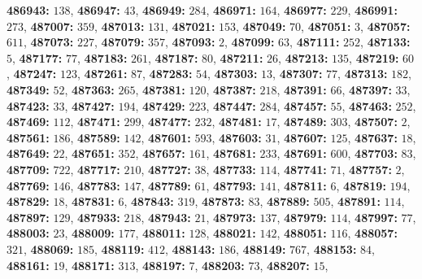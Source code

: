 \textsf{\bfseries 486943:} $138$, \textsf{\bfseries 486947:} $43$, \textsf{\bfseries 486949:} $284$, \textsf{\bfseries 486971:} $164$, \textsf{\bfseries 486977:} $229$, \textsf{\bfseries 486991:} $273$, \textsf{\bfseries 487007:} $359$, \textsf{\bfseries 487013:} $131$, \textsf{\bfseries 487021:} $153$, \textsf{\bfseries 487049:} $70$, \textsf{\bfseries 487051:} $3$, \textsf{\bfseries 487057:} $611$, \textsf{\bfseries 487073:} $227$, \textsf{\bfseries 487079:} $357$, \textsf{\bfseries 487093:} $2$, \textsf{\bfseries 487099:} $63$, \textsf{\bfseries 487111:} $252$, \textsf{\bfseries 487133:} $5$, \textsf{\bfseries 487177:} $77$, \textsf{\bfseries 487183:} $261$, \textsf{\bfseries 487187:} $80$, \textsf{\bfseries 487211:} $26$, \textsf{\bfseries 487213:} $135$, \textsf{\bfseries 487219:} $60$, \textsf{\bfseries 487247:} $123$, \textsf{\bfseries 487261:} $87$, \textsf{\bfseries 487283:} $54$, \textsf{\bfseries 487303:} $13$, \textsf{\bfseries 487307:} $77$, \textsf{\bfseries 487313:} $182$, \textsf{\bfseries 487349:} $52$, \textsf{\bfseries 487363:} $265$, \textsf{\bfseries 487381:} $120$, \textsf{\bfseries 487387:} $218$, \textsf{\bfseries 487391:} $66$, \textsf{\bfseries 487397:} $33$, \textsf{\bfseries 487423:} $33$, \textsf{\bfseries 487427:} $194$, \textsf{\bfseries 487429:} $223$, \textsf{\bfseries 487447:} $284$, \textsf{\bfseries 487457:} $55$, \textsf{\bfseries 487463:} $252$, \textsf{\bfseries 487469:} $112$, \textsf{\bfseries 487471:} $299$, \textsf{\bfseries 487477:} $232$, \textsf{\bfseries 487481:} $17$, \textsf{\bfseries 487489:} $303$, \textsf{\bfseries 487507:} $2$, \textsf{\bfseries 487561:} $186$, \textsf{\bfseries 487589:} $142$, \textsf{\bfseries 487601:} $593$, \textsf{\bfseries 487603:} $31$, \textsf{\bfseries 487607:} $125$, \textsf{\bfseries 487637:} $18$, \textsf{\bfseries 487649:} $22$, \textsf{\bfseries 487651:} $352$, \textsf{\bfseries 487657:} $161$, \textsf{\bfseries 487681:} $233$, \textsf{\bfseries 487691:} $600$, \textsf{\bfseries 487703:} $83$, \textsf{\bfseries 487709:} $722$, \textsf{\bfseries 487717:} $210$, \textsf{\bfseries 487727:} $38$, \textsf{\bfseries 487733:} $114$, \textsf{\bfseries 487741:} $71$, \textsf{\bfseries 487757:} $2$, \textsf{\bfseries 487769:} $146$, \textsf{\bfseries 487783:} $147$, \textsf{\bfseries 487789:} $61$, \textsf{\bfseries 487793:} $141$, \textsf{\bfseries 487811:} $6$, \textsf{\bfseries 487819:} $194$, \textsf{\bfseries 487829:} $18$, \textsf{\bfseries 487831:} $6$, \textsf{\bfseries 487843:} $319$, \textsf{\bfseries 487873:} $83$, \textsf{\bfseries 487889:} $505$, \textsf{\bfseries 487891:} $114$, \textsf{\bfseries 487897:} $129$, \textsf{\bfseries 487933:} $218$, \textsf{\bfseries 487943:} $21$, \textsf{\bfseries 487973:} $137$, \textsf{\bfseries 487979:} $114$, \textsf{\bfseries 487997:} $77$, \textsf{\bfseries 488003:} $23$, \textsf{\bfseries 488009:} $177$, \textsf{\bfseries 488011:} $128$, \textsf{\bfseries 488021:} $142$, \textsf{\bfseries 488051:} $116$, \textsf{\bfseries 488057:} $321$, \textsf{\bfseries 488069:} $185$, \textsf{\bfseries 488119:} $412$, \textsf{\bfseries 488143:} $186$, \textsf{\bfseries 488149:} $767$, \textsf{\bfseries 488153:} $84$, \textsf{\bfseries 488161:} $19$, \textsf{\bfseries 488171:} $313$, \textsf{\bfseries 488197:} $7$, \textsf{\bfseries 488203:} $73$, \textsf{\bfseries 488207:} $15$, 
